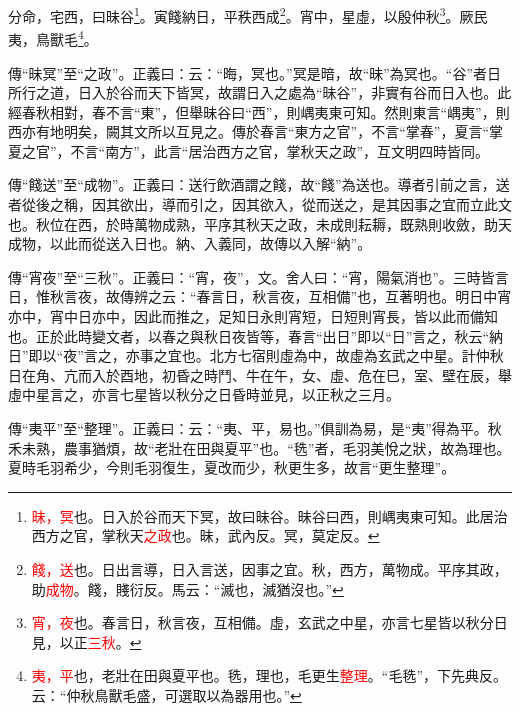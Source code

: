 分命，宅西，曰昧谷\footnote{\textcolor{red}{昧，冥}也。日入於谷而天下冥，故曰昧谷。昧谷曰西，則嵎夷東可知。此居治西方之官，掌秋天\textcolor{red}{之政}也。昧，武內反。冥，莫定反。}。寅餞納日，平秩西成\footnote{\textcolor{red}{餞，送}也。日出言導，日入言送，因事之宜。秋，西方，萬物成。平序其政，助\textcolor{red}{成物}。餞，賤衍反。馬云：“滅也，滅猶沒也。”}。宵中，星虛，以殷仲秋\footnote{\textcolor{red}{宵，夜}也。春言日，秋言夜，互相備。虛，玄武之中星，亦言七星皆以秋分日見，以正\textcolor{red}{三秋}。}。厥民夷，鳥獸毛\footnote{\textcolor{red}{夷，平}也，老壯在田與夏平也。毨，理也，毛更生\textcolor{red}{整理}。“毛毨”，下先典反。云：“仲秋鳥獸毛盛，可選取以為器用也。”}。

{\noindent\zhuan{}\fzbyks 傳“昧冥”至“之政”。正義曰：云：“晦，冥也。”冥是暗，故“昧”為冥也。“谷”者日所行之道，日入於谷而天下皆冥，故謂日入之處為“昧谷”，非實有谷而日入也。此經春秋相對，春不言“東”，但舉昧谷曰“西”，則嵎夷東可知。然則東言“嵎夷”，則西亦有地明矣，闕其文所以互見之。傳於春言“東方之官”，不言“掌春”，夏言“掌夏之官”，不言“南方”，此言“居治西方之官，掌秋天之政”，互文明四時皆同。 \par}

{\noindent\zhuan{}\fzbyks 傳“餞送”至“成物”。正義曰：送行飲酒謂之餞，故“餞”為送也。導者引前之言，送者從後之稱，因其欲出，導而引之，因其欲入，從而送之，是其因事之宜而立此文也。秋位在西，於時萬物成熟，平序其秋天之政，未成則耘耨，既熟則收斂，助天成物，以此而從送入日也。納、入義同，故傳以入解“納”。 \par}

{\noindent\zhuan{}\fzbyks 傳“宵夜”至“三秋”。正義曰：“宵，夜”，文。舍人曰：“宵，陽氣消也”。三時皆言日，惟秋言夜，故傳辨之云：“春言日，秋言夜，互相備”也，互著明也。明日中宵亦中，宵中日亦中，因此而推之，足知日永則宵短，日短則宵長，皆以此而備知也。正於此時變文者，以春之與秋日夜皆等，春言“出日”即以“日”言之，秋云“納日”即以“夜”言之，亦事之宜也。北方七宿則虛為中，故虛為玄武之中星。計仲秋日在角、亢而入於酉地，初昏之時鬥、牛在午，女、虛、危在巳，室、壁在辰，舉虛中星言之，亦言七星皆以秋分之日昏時並見，以正秋之三月。 \par}

{\noindent\zhuan{}\fzbyks 傳“夷平”至“整理”。正義曰：云：“夷、平，易也。”俱訓為易，是“夷”得為平。秋禾未熟，農事猶煩，故“老壯在田與夏平”也。“毨”者，毛羽美悅之狀，故為理也。夏時毛羽希少，今則毛羽復生，夏改而少，秋更生多，故言“更生整理”。 \par}


